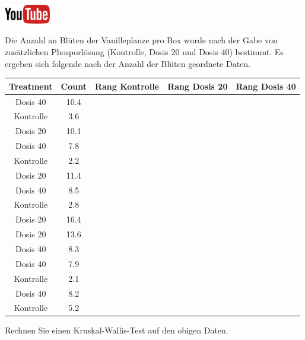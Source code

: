 \documentclass[a4paper, 9pt]{scrartcl}\usepackage[]{graphicx}\usepackage[]{xcolor}
\newenvironment{knitrout}{}{} %
\begin{document}
\hfill\href{https://youtu.be/gC0SXiIG2wQ}{\includegraphics[width =
  2cm]{img/youtube}} %
\hspace{2Ex}




Die Anzahl an Bl{\"u}ten der Vanilleplanze pro Box wurde nach der Gabe von
zus{\"a}tzlichen Phosporl{\"o}sung (Kontrolle, Dosis 20 und Dosis 40) bestimmt. Es
ergeben sich folgende nach der Anzahl der Bl{\"u}ten geordnete Daten.

\begin{knitrout}
\color{fgcolor}\begin{table}[!h]
\centering
\begin{tabular}{ccccc}
\toprule
Treatment & Count & Rang Kontrolle & Rang Dosis 20 & Rang Dosis 40\\
\midrule
Dosis 40 & 10.4 &  &  & \\
Kontrolle & 3.6 &  &  & \\
Dosis 20 & 10.1 &  &  & \\
Dosis 40 & 7.8 &  &  & \\
Kontrolle & 2.2 &  &  & \\
\addlinespace
Dosis 20 & 11.4 &  &  & \\
Dosis 40 & 8.5 &  &  & \\
Kontrolle & 2.8 &  &  & \\
Dosis 20 & 16.4 &  &  & \\
Dosis 20 & 13.6 &  &  & \\
\addlinespace
Dosis 40 & 8.3 &  &  & \\
Dosis 40 & 7.9 &  &  & \\
Kontrolle & 2.1 &  &  & \\
Dosis 40 & 8.2 &  &  & \\
Kontrolle & 5.2 &  &  & \\
\bottomrule
\end{tabular}
\end{table}

\end{knitrout}

Rechnen Sie einen Kruskal-Wallis-Test auf den obigen Daten.
\end{document}
